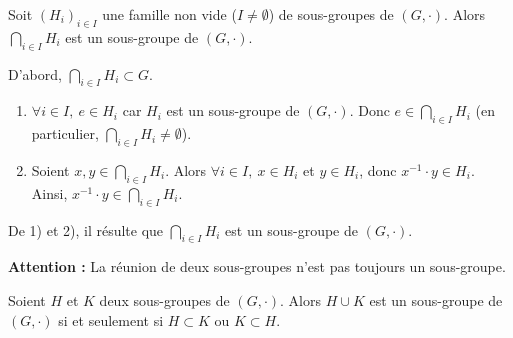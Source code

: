 \documentclass[a4paper,11pt]{article}
\begin{document}
\begin{proposition}
Soit $(H_i)_{i \in I}$ une famille non vide ($I \neq \emptyset$) de sous-groupes de $(G, \cdot)$. Alors $\displaystyle\bigcap_{i \in I} H_i$ est un sous-groupe de $(G, \cdot)$.
\end{proposition}

\begin{demonstration}
D'abord, $\displaystyle\bigcap_{i \in I} H_i \subset G$.
\begin{enumerate}
    \item $\forall i \in I, \ e \in H_i$ car $H_i$ est un sous-groupe de $(G, \cdot)$. Donc $e \in \displaystyle\bigcap_{i \in I} H_i$ (en particulier, $\displaystyle\bigcap_{i \in I} H_i \neq \emptyset$).
    \item Soient $x, y \in \displaystyle\bigcap_{i \in I} H_i$. Alors $\forall i \in I, \ x \in H_i$ et $y \in H_i$, donc $x^{-1} \cdot y \in H_i$.
    Ainsi, $x^{-1} \cdot y \in \displaystyle\bigcap_{i \in I} H_i$.
\end{enumerate}
De 1) et 2), il résulte que $\displaystyle\bigcap_{i \in I} H_i$ est un sous-groupe de $(G, \cdot)$.
\end{demonstration}

\begin{remarque}
\textbf{Attention :} La réunion de deux sous-groupes n'est pas toujours un sous-groupe.
\end{remarque}

\begin{proposition}
Soient $H$ et $K$ deux sous-groupes de $(G, \cdot)$. Alors $H \cup K$ est un sous-groupe de $(G, \cdot)$ si et seulement si $H \subset K$ ou $K \subset H$.
\end{proposition}
\end{document}
